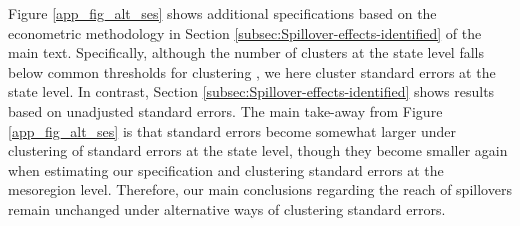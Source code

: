 Figure \ref{app_fig_alt_ses} shows additional specifications based on the econometric methodology in Section \ref{subsec:Spillover-effects-identified} of the main text. Specifically, although the number of clusters at the state level falls below common thresholds for clustering , we here cluster standard errors at the state level. In contrast, Section \ref{subsec:Spillover-effects-identified} shows results based on unadjusted standard errors. The main take-away from Figure \ref{app_fig_alt_ses} is that standard errors become somewhat larger under clustering of standard errors at the state level, though they become smaller again when estimating our specification and clustering standard errors at the mesoregion level. Therefore, our main conclusions regarding the reach of spillovers remain unchanged under alternative ways of clustering standard errors.


